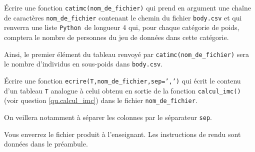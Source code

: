 \question{} \'Ecrire une fonction \texttt{catimc(nom\_de\_fichier)} qui prend en argument une chaîne de caractères \texttt{nom\_de\_fichier} contenant le chemin du fichier \texttt{body.csv} et qui renverra une liste \texttt{Python}\ de longueur 4 qui, pour chaque catégorie de poids, comptera le nombre de personnes du jeu de données dans cette catégorie. 
    
    Ainsi, le premier élément du tableau renvoyé par \texttt{catimc(nom\_de\_fichier)} sera le nombre d'individus en sous-poids dans \texttt{body.csv}. 

%

\question{} \label{q.write} \'Ecrire une fonction \texttt{ecrire(T,nom\_de\_fichier,sep=',')} qui écrit le contenu d'un tableau \texttt{T} analogue à celui obtenu en sortie de la fonction \texttt{calcul\_imc()} (voir question \ref{qu.calcul_imc}) dans le fichier \texttt{nom\_de\_fichier}. 

On veillera notamment à séparer les colonnes par le séparateur \texttt{sep}.
    
Vous enverrez le fichier produit à l'enseignant. Les instructions de rendu sont données dans le préambule.